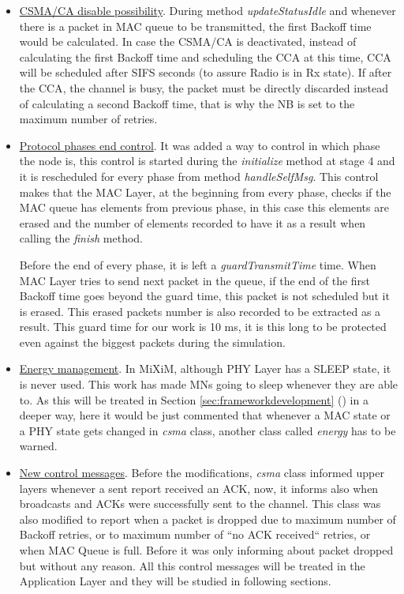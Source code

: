 \begin{itemize}
 \item \underline{\ac{CSMA/CA} disable possibility}. During method \textit{updateStatusIdle} and whenever there is a packet in \ac{MAC} queue to
be transmitted, the first Backoff time would be calculated. In case the \ac{CSMA/CA} is deactivated, instead of calculating the first Backoff
time and scheduling the \ac{CCA} at this time, \ac{CCA} will be scheduled after \ac{SIFS} seconds (to assure Radio is in Rx state). If after the
\ac{CCA}, the channel is busy, the packet must be directly discarded instead of calculating a second Backoff time, that is why the \ac{NB} is 
set to the maximum number of retries. 
 \item \underline{Protocol phases end control}. It was added a way to control in which phase the node is, this control is started during the
\textit{initialize} method at stage 4 and it is rescheduled for every phase from method \textit{handleSelfMsg}. This control makes that the 
\ac{MAC} Layer, at the beginning from every phase, checks if the \ac{MAC} queue has elements from previous phase, in this case this elements
are erased and the number of elements recorded to have it as a result when calling the \textit{finish} method.

Before the end of every phase, it is left a \textit{guardTransmitTime} time. When \ac{MAC} Layer tries to send next packet in the queue, if the end of 
the first Backoff time goes beyond the guard time, this packet is not scheduled but it is erased. This erased packets number is also recorded
to be extracted as a result. This guard time for our work is 10 ms, it is this long to be protected even against the biggest packets during the 
simulation.
 \item \underline{Energy management}. In \ac{MiXiM}, although \ac{PHY} Layer has a SLEEP state, it is never used. This work has made \acp{MN}
going to sleep whenever they are able to. As this will be treated in Section \ref{sec:frameworkdevelopment} ()
in a deeper way, here it would be just commented that whenever a \ac{MAC} state or a \ac{PHY} state gets changed in \textit{csma} class, another
class called \textit{energy} has to be warned.
 \item \underline{New control messages}. Before the modifications, \textit{csma} class informed upper layers whenever a sent report received an
\ac{ACK}, now, it informs also when broadcasts and \acp{ACK} were successfully sent to the channel. This class was also modified to 
report when a packet is dropped due to maximum number of Backoff retries, or to maximum number of ``no \ac{ACK} received`` retries, or when
\ac{MAC} Queue is full. Before it was only informing about packet dropped but without any reason. All this control messages will be treated 
in the Application Layer and they will be studied in following sections.
\end{itemize}

